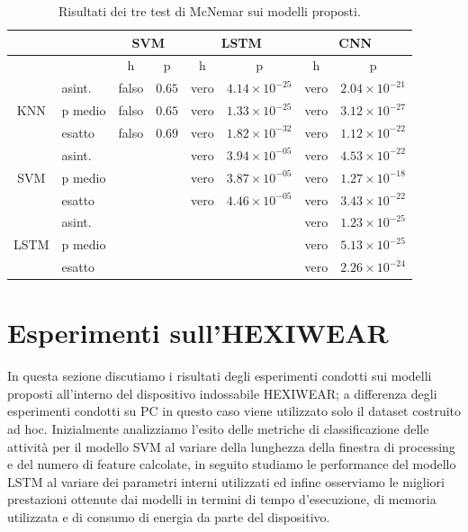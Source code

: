 \begin{table}
    \centering
    \begin{tabular}{c | l | c c | c c | c c }
        \hline
        & & \multicolumn{2}{c}{SVM} & \multicolumn{2}{c}{LSTM} & \multicolumn{2}{c}{CNN} \\
        \hline
                                &            & h     & p    & h    & p                      & h    & p \\
        \hline
        \multirow{3}{*}{KNN}    & asint.     & falso & $0.65$ & vero & $4.14 \times 10^{-25}$ & vero & $2.04 \times 10^{-21}$ \\
                                & p medio    & falso & $0.65$ & vero & $1.33 \times 10^{-25}$ & vero & $3.12 \times 10^{-27}$ \\
                                & esatto     & falso & $0.69$ & vero & $1.82 \times 10^{-32}$ & vero & $1.12 \times 10^{-22}$ \\
        \hline
        \multirow{3}{*}{SVM}    & asint.     &       &        & vero & $3.94 \times 10^{-05}$ & vero & $4.53 \times 10^{-22}$ \\
                                & p medio    &       &        & vero & $3.87 \times 10^{-05}$ & vero & $1.27 \times 10^{-18}$ \\
                                & esatto     &       &        & vero & $4.46 \times 10^{-05}$ & vero & $3.43 \times 10^{-22}$ \\
        \hline
        \multirow{3}{*}{LSTM}   & asint.     &       &        &      &                        & vero & $1.23 \times 10^{-25}$ \\
                                & p medio    &       &        &      &                        & vero & $5.13 \times 10^{-25}$ \\
                                & esatto     &       &        &      &                        & vero & $2.26 \times 10^{-24}$ \\ 
        \hline
    \end{tabular}
    \caption{Risultati dei tre test di McNemar sui modelli proposti.}
    \label{tab:mc-nemar-results}
\end{table}

\section{Esperimenti sull'HEXIWEAR}
\label{sec:esperimenti-sull-hexiwear}

In questa sezione discutiamo i risultati degli esperimenti condotti sui modelli proposti all'interno del dispositivo indossabile HEXIWEAR; a differenza degli esperimenti condotti su PC in questo caso viene utilizzato solo il dataset costruito ad hoc. Inizialmente analizziamo l'esito delle metriche di classificazione delle attività per il modello SVM al variare della lunghezza della finestra di processing e del numero di feature calcolate, in seguito studiamo le performance del modello LSTM al variare dei parametri interni utilizzati ed infine osserviamo le migliori prestazioni ottenute dai modelli in termini di tempo d'esecuzione, di memoria utilizzata e di consumo di energia da parte del dispositivo.

